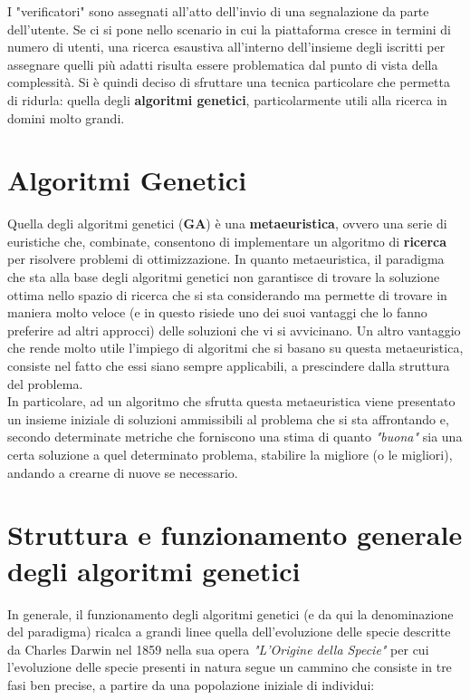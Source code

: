     I "verificatori" sono assegnati all'atto dell'invio di una segnalazione da parte dell'utente. 
    Se ci si pone nello scenario in cui la piattaforma cresce in termini di numero di utenti, una ricerca esaustiva all'interno dell'insieme degli iscritti per assegnare quelli più adatti risulta essere problematica dal punto di vista della complessità. Si è quindi deciso di sfruttare una tecnica particolare che permetta di ridurla: quella degli \textbf{algoritmi genetici}, particolarmente utili alla ricerca in domini molto grandi.

\section{Algoritmi Genetici}
    Quella degli algoritmi genetici (\textbf{GA}) è una \textbf{metaeuristica}, ovvero una serie di euristiche che, combinate, consentono di implementare un algoritmo di \textbf{ricerca} per risolvere problemi di ottimizzazione. In quanto metaeuristica, il paradigma che sta alla base degli algoritmi genetici non garantisce di trovare la soluzione ottima nello spazio di ricerca che si sta considerando ma permette di trovare in maniera molto veloce (e in questo risiede uno dei suoi vantaggi che lo fanno preferire ad altri approcci) delle soluzioni che vi si avvicinano. Un altro vantaggio che rende molto utile l'impiego di algoritmi che si basano su questa metaeuristica, consiste nel fatto che essi siano sempre applicabili, a prescindere dalla struttura del problema. \\
    In particolare, ad un algoritmo che sfrutta questa metaeuristica viene presentato un insieme iniziale di soluzioni ammissibili al problema che si sta affrontando e, secondo determinate metriche che forniscono una stima di quanto \textit{"buona"} sia una certa soluzione a quel determinato problema, stabilire la migliore (o le migliori), andando a crearne di nuove se necessario.

\section{Struttura e funzionamento generale degli algoritmi genetici}
    In generale, il funzionamento degli algoritmi genetici (e da qui la denominazione del paradigma) ricalca a grandi linee quella dell'evoluzione delle specie descritte da Charles Darwin nel 1859 nella sua opera \textit{"L'Origine della Specie"} per cui l'evoluzione delle specie presenti in natura segue un cammino che consiste in tre fasi ben precise, a partire da una popolazione iniziale di individui:

